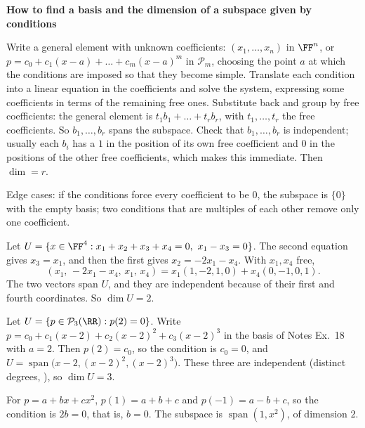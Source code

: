 \documentclass[10pt]{scrartcl}
\DeclareMathOperator{\spn}{span}
\newcommand{\PP}{\mathcal P}
\newenvironment{methodbox}[1]{\begin{mdframed}[style=methodstyle]\textbf{\color{NavyBlue}#1}\par\vspace{2pt}}{\end{mdframed}}
\begin{document}
\begin{methodbox}{How to find a basis and the dimension of a subspace given by conditions}
  \begin{steps}
    \ii Write a general element with unknown coefficients: $(x_1,\dots,x_n)$ in $\FF^n$, or $p=c_0+c_1(x-a)+\dots+c_m(x-a)^m$ in $\PP_m$, choosing the point $a$ at which the conditions are imposed so that they become simple.
    \ii Translate each condition into a linear equation in the coefficients and solve the system, expressing some coefficients in terms of the remaining free ones.
    \ii Substitute back and group by free coefficients: the general element is $t_1b_1+\dots+t_rb_r$, with $t_1,\dots,t_r$ the free coefficients. So $b_1,\dots,b_r$ spans the subspace.
    \ii Check that $b_1,\dots,b_r$ is independent; usually each $b_i$ has a $1$ in the position of its own free coefficient and $0$ in the positions of the other free coefficients, which makes this immediate. Then $\dim=r$.
  \end{steps}
  Edge cases: if the conditions force every coefficient to be $0$, the subspace is $\{0\}$ with the empty basis; two conditions that are multiples of each other remove only one coefficient.
\end{methodbox}

\begin{example*}
  Let $U=\{x\in\FF^4: x_1+x_2+x_3+x_4=0,\ x_1-x_3=0\}$. The second equation gives $x_3=x_1$, and then the first gives $x_2=-2x_1-x_4$. With $x_1,x_4$ free,
  \[
    (x_1,\,-2x_1-x_4,\,x_1,\,x_4)=x_1(1,-2,1,0)+x_4(0,-1,0,1).
  \]
  The two vectors span $U$, and they are independent because of their first and fourth coordinates. So $\dim U=2$.
\end{example*}

\begin{example*}[Polynomials in $\PP_3(\RR)$ vanishing at $2$]
  Let $U=\{p\in\PP_3(\RR):p(2)=0\}$. Write $p=c_0+c_1(x-2)+c_2(x-2)^2+c_3(x-2)^3$ in the basis of Notes Ex.~18 with $a=2$. Then $p(2)=c_0$, so the condition is $c_0=0$, and $U=\spn\bigl(x-2,(x-2)^2,(x-2)^3\bigr)$. These three are independent (distinct degrees, ), so $\dim U=3$.
\end{example*}

\begin{example*}[A condition that does not involve every coefficient: $p(1)=p(-1)$ in $\PP_2(\RR)$]
  For $p=a+bx+cx^2$, $p(1)=a+b+c$ and $p(-1)=a-b+c$, so the condition is $2b=0$, that is, $b=0$. The subspace is $\spn(1,x^2)$, of dimension $2$.
\end{example*}
\end{document}
